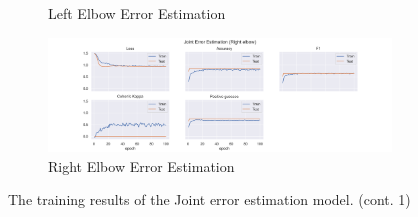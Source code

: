 \begin{figure}
\begin{subfigure}[b]{0.47\linewidth}
      \caption{Left Elbow Error Estimation}
      \label{fig:leel_jt_ee}
  \end{subfigure}
  \hfill
  \begin{subfigure}[b]{0.47\linewidth}
      \centering
      \includegraphics[width=\textwidth]{figures/Results/jt/JointErrorEstimation_Right elbow.png}
      \caption{Right Elbow Error Estimation}
      \label{fig:reel_jt_ee}
  \end{subfigure}
  \caption[Joint model training results]{The training results of the Joint error estimation model. (cont. 1)}
  \label{fig:Joint_training_results_1}
\end{figure}


